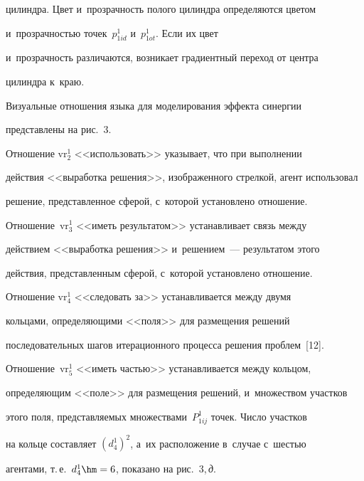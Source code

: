 цилиндра. Цвет и~прозрачность полого цилиндра определяются цветом 


и~прозрачностью точек~$p^1_{1id}$ и~$p^1_{1ot}$. Если их цвет 


и~прозрачность различаются, возникает градиентный переход от центра 


цилиндра к~краю.


  


  Визуальные отношения языка для моделирования эффекта синергии 


представлены на рис.~3. 








  Отношение $\mathrm{vr}_2^1$ <<использовать>> указывает, что при выполнении 


действия <<выработка решения>>, изображенного стрелкой, агент использовал 


решение, представленное сферой, с~которой установлено отношение. 


Отношение~$\mathrm{vr}_3^1$ <<иметь результатом>> устанавливает связь между 


действием <<выработка решения>> и~решением~--- результатом этого 


действия, представленным сферой, с~которой установлено отношение. 


Отношение $\mathrm{vr}_4^1$ <<следовать за>> устанавливается между двумя 


кольцами, определяющими <<поля>> для размещения решений 


последовательных шагов итерационного процесса решения проблем~[12]. 


Отношение~$\mathrm{vr}_5^1$ <<иметь частью>> устанавливается между кольцом, 


определяющим <<поле>> для размещения решений, и~множеством участков 


этого поля, пред\-став\-ля\-емых множествами~$P^1_{1ij}$ точек. Число участков 


на кольце составляет $(d_4^1)^2$, а~их расположение в~случае с~шестью 


агентами, т.\,е.\ $d_4^1\hm=6$, показано на рис.~3,\,\textit{д}.


{





}


  


